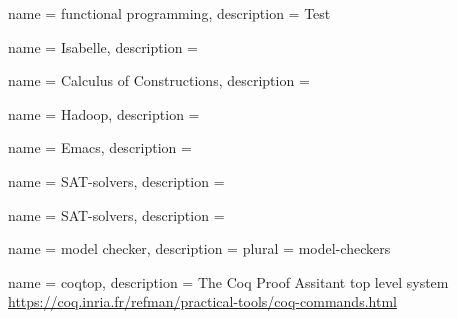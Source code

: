  
{name = functional programming,
description = {Test %
}}

{name = Isabelle,
description = {%
}}

{name = Calculus of Constructions,
description = {%
}}

{name = Hadoop,
description = {%
}}

{name = Emacs,
description = {%
}}

{name = SAT-solvers,
description = {%
}}

{name = SAT-solvers,
 description = {%
}}

{name = model checker,
description = {
}
plural = {model-checkers}
}

{name = coqtop, 
description = {The Coq Proof Assitant top level system \url{https://coq.inria.fr/refman/practical-tools/coq-commands.html}
}}






